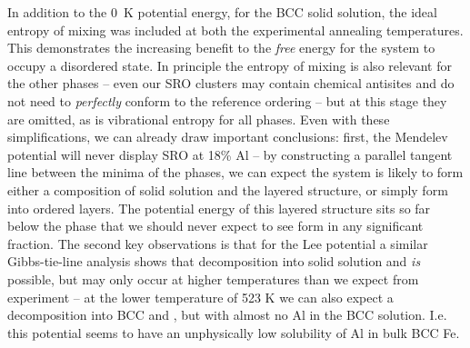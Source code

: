 In addition to the 0~K potential energy, for the BCC solid solution, the ideal entropy of mixing was included at both the experimental annealing temperatures.
This demonstrates the increasing benefit to the \emph{free} energy for the system to occupy a disordered state.
In principle the entropy of mixing is also relevant for the other phases -- even our SRO clusters may contain chemical antisites and do not need to \emph{perfectly} conform to the reference ordering -- but at this stage they are omitted, as is vibrational entropy for all phases.
Even with these simplifications, we can already draw important conclusions: first, the Mendelev potential will never display \DOTHREE SRO at 18\% Al -- by constructing a parallel tangent line between the minima of the phases, we can expect the system is likely to form either a composition of solid solution and the layered structure, or simply form into ordered layers.
The potential energy of this layered structure sits so far below the \DOTHREE phase that we should never expect to see \DOTHREE form in any significant fraction.
The second key observations is that for the Lee potential a similar Gibbs-tie-line analysis shows that decomposition into solid solution and \DOTHREE \emph{is} possible, but may only occur at higher temperatures than we expect from experiment -- at the lower temperature of 523 K we can also expect a decomposition into BCC and \DOTHREE, but with almost no Al in the BCC solution.
I.e. this potential seems to have an unphysically low solubility of Al in bulk BCC Fe.

